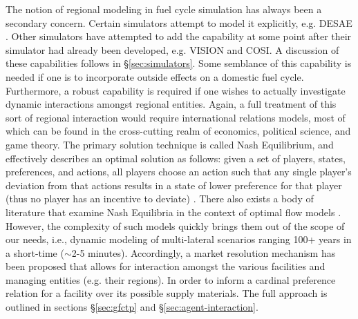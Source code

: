 The notion of regional modeling in fuel cycle simulation has always been a
secondary concern. Certain simulators attempt to model it explicitly, e.g. DESAE
\cite{iaea_nuclear_2010}. Other simulators have attempted to add the capability
at some point after their simulator had already been developed, e.g. VISION and
COSI. A discussion of these capabilities follows in \S\ref{sec:simulators}. Some
semblance of this capability is needed if one is to incorporate outside effects
on a domestic fuel cycle. Furthermore, a robust capability is required if one
wishes to actually investigate dynamic interactions amongst regional
entities. Again, a full treatment of this sort of regional interaction would
require international relations models, most of which can be found in the
cross-cutting realm of economics, political science, and game theory. The
primary solution technique is called Nash Equilibrium, and effectively describes
an optimal solution as follows: given a set of players, states, preferences,
and actions, all players choose an action such that any single player's
deviation from that actions results in a state of lower preference for that
player (thus no player has an incentive to deviate)
\cite{mccarty_political_2007}. There also exists a body of literature that
examine Nash Equilibria in the context of optimal flow models
\cite{mazumdar_fairness_1991,nagurney_supply_2002,song_nash_2002}. However, the
complexity of such models quickly brings them out of the scope of our needs,
i.e., dynamic modeling of multi-lateral scenarios ranging 100+ years in a
short-time ($\sim$2-5 minutes). Accordingly, a market resolution mechanism has
been proposed that allows for interaction amongst the various facilities and
managing entities (e.g. their regions). In order to inform a cardinal preference
\cite{strotz_cardinal_1953} relation for a facility over its possible supply
materials. The full approach is outlined in sections \S\ref{sec:gfctp} and
\S\ref{sec:agent-interaction}.
